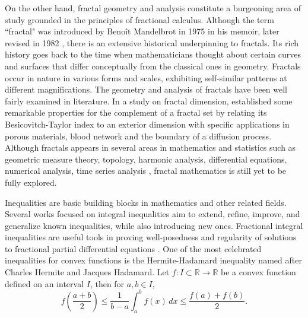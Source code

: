 \documentclass[10pt]{article}
\begin{document}
On the other hand, fractal geometry and analysis constitute a burgeoning area of study grounded in the principles of fractional calculus. Although the term ``fractal" was introduced by Beno\^it Mandelbrot in 1975 in his memoir,  later revised in 1982 \cite{man}, there is an extensive historical underpinning to fractals. Its rich history goes back to the time when mathematicians thought about certain curves and surfaces that differ conceptually from the classical ones in  geometry. Fractals occur in nature in various forms and scales, exhibiting self-similar patterns at different magnifications. The geometry and analysis of fractals have been well fairly examined in literature. In a study on fractal dimension, \cite{tri} established some remarkable properties for the complement of a fractal set by relating its Besicovitch-Taylor index to an exterior dimension with specific applications in porous materials, blood network and the boundary of a diffusion process. Although fractals appears in several areas in mathematics and statistics such as geometric measure theory, topology, harmonic analysis, differential equations, numerical analysis, time series analysis \cite{frank, por, kra, miller, owo, part}, fractal mathematics is still yet to be fully explored.










Inequalities are basic building blocks in mathematics and other related fields. Several works focused on integral inequalities aim to extend, refine, improve, and generalize known inequalities, while also introducing new ones. Fractional integral inequalities are useful tools in proving well-posedness and regularity of solutions to fractional partial differential equations \cite{wang}. One of the most celebrated inequalities for convex functions is the Hermite-Hadamard inequality named after Charles Hermite and Jacques Hadamard. Let $f:I \subset\mathbb{R} \rightarrow\mathbb{R}$ be a convex function defined on an interval $I$, then for $a,b\in I$, 
$$f\left(\frac{a+b}{2}\right)\leq \frac{1}{b-a} \int_a^b f(x)\, dx\leq \frac{f(a)+f(b)}{2}.$$
\end{document}
